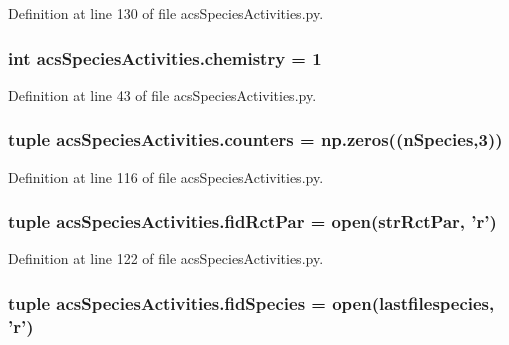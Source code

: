 Definition at line 130 of file acs\-Species\-Activities.\-py.

\hypertarget{a00103_a5459c566e6ccdf02747a3c16089a5593}{
\subsubsection[{chemistry}]{\setlength{\rightskip}{0pt plus 5cm}int acs\-Species\-Activities.\-chemistry = 1}}\label{a00103_a5459c566e6ccdf02747a3c16089a5593}


Definition at line 43 of file acs\-Species\-Activities.\-py.

\hypertarget{a00103_a6afffdd046bbc3bc4fbee34b561fcae5}{
\subsubsection[{counters}]{\setlength{\rightskip}{0pt plus 5cm}tuple acs\-Species\-Activities.\-counters = np.\-zeros((n\-Species,3))}}\label{a00103_a6afffdd046bbc3bc4fbee34b561fcae5}


Definition at line 116 of file acs\-Species\-Activities.\-py.

\hypertarget{a00103_a64247b23c199d0b0d0d60f02ec8682e3}{
\subsubsection[{fid\-Rct\-Par}]{\setlength{\rightskip}{0pt plus 5cm}tuple acs\-Species\-Activities.\-fid\-Rct\-Par = open({\bf str\-Rct\-Par}, '{\bf r}')}}\label{a00103_a64247b23c199d0b0d0d60f02ec8682e3}


Definition at line 122 of file acs\-Species\-Activities.\-py.

\hypertarget{a00103_a240d5b3cd72043528f4b674a8ba00a33}{
\subsubsection[{fid\-Species}]{\setlength{\rightskip}{0pt plus 5cm}tuple acs\-Species\-Activities.\-fid\-Species = open({\bf lastfilespecies}, '{\bf r}')}}\label{a00103_a240d5b3cd72043528f4b674a8ba00a33}


